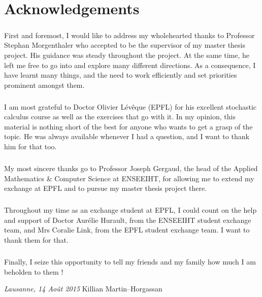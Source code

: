 \chapter*{Acknowledgements}

\bigskip
\paragraph{}
First and foremost, I would like to address my wholehearted thanks to Professor Stephan Morgenthaler who accepted to be the supervisor of my master thesis project. His guidance was steady throughout the project. At the same time, he left me free to go into and explore many different directions. As a consequence, I have learnt many things, and the need to work efficiently and set priorities prominent amongst them.
\paragraph{}
I am most grateful to Doctor Olivier Lévêque (EPFL) for his excellent stochastic calculus course as well as the exercises that go with it. In my opinion, this material is nothing short of the best for anyone who wants to get a grasp of the topic. He was always available whenever I had a question, and I want to thank him for that too.
\paragraph{}
My most sincere thanks go to Professor Joseph Gergaud, the head of the Applied Mathematics \& Computer Science at ENSEEIHT, for allowing me to extend my exchange at EPFL and to pursue my master thesis project there.
\paragraph{}
Throughout my time as an exchange student at EPFL, I could count on the help and support of Doctor Aurélie Hurault, from the ENSEEIHT student exchange team, and Mrs Coralie Link, from the EPFL student exchange team. I want to thank them for that.
\paragraph{}
Finally, I seize this opportunity to tell my friends and my family how much I am beholden to them !
\bigskip
 
\noindent\textit{Lausanne, 14 Ao\^{u}t 2015}
\hfill Killian Martin--Horgassan
